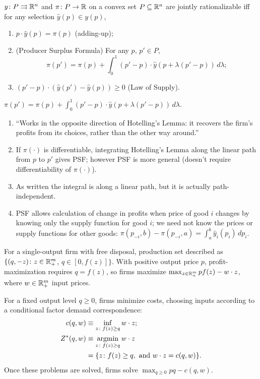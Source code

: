 \documentclass[8pt,letterpaper, landscape]{extarticle} %
\begin{document}
\begin{multicols}{3}
\begin{description}
 $ y \colon P \rightrightarrows \mathbb{R}^n $ and $ \pi \colon P \to \mathbb{R} $ on a convex set $ P \subseteq \mathbb{R}^n $ are jointly rationalizable iff for any selection $ \hat{y}(p) \in y(p) $,
\begin{enumerate}
\item $ p \cdot \hat{y}(p) = \pi(p) $ (adding-up);
\item (Producer Surplus Formula) For any $ p $, $ p' \in P $,
$$ \pi (p') = \pi (p) + \int_{0}^{1} (p' - p) \cdot \hat{y}(p + \lambda (p' - p)) \, d \lambda; $$
\item $ (p' - p) \cdot (\hat{y}(p') - \hat{y}(p)) \geq 0 $ (Law of Supply).
\end{enumerate}

 $ \pi (p') = \pi (p) + \int_{0}^{1} (p' - p) \cdot \hat{y}(p + \lambda (p' - p)) \, d \lambda $.
\begin{enumerate}
\item ``Works in the opposite direction of Hotelling's Lemma: it recovers the firm's profits from its choices, rather than the other way around.''
\item If $ \pi (\cdot) $ is differentiable, integrating Hotelling's Lemma along the linear path from $ p $ to $ p' $ gives PSF; however PSF is more general (doesn't require differentiability of $ \pi (\cdot) $).
\item As written the integral is along a linear path, but it is actually path-independent.
\item PSF allows calculation of change in profits when price of good $ i $ changes by knowing only the supply function for good $ i $; we need not know the prices or supply functions for other goods: $ \pi (p_{-i}, b) -  \pi (p_{-i}, a) = \int_{a}^{b} \hat{y}_i (p_i) \, dp_i $.
\end{enumerate}

 For a single-output firm with free disposal, production set described as $ \{ (q, -z) \colon z \in \mathbb{R}_+^m $, $ q \in [0, f(z)] \} $. With positive output price $ p $, profit-maximization requires $ q = f(z) $, so firms maximize
$ \max_{z \in \mathbb{R}_+^m} pf(z) - w \cdot z $, where $ w \in \mathbb{R}_+^m $ input prices.

 For a fixed output level $ q \geq 0 $, firms minimize costs, choosing inputs according to a conditional factor demand correspondence:
\begin{align*}
c(q,w) &\equiv \inf_{z \colon f(z) \geq q} w \cdot z; \\
Z^*(q,w) &\equiv \operatorname*{argmin}_{z \colon f(z) \geq q} w \cdot z \\
&= \{ z \colon f(z) \geq q, \text{ and } w \cdot z = c(q,w) \} .
\end{align*}
Once these problems are solved, firms solve $ \max_{q \geq 0} pq - c(q,w) $.


\end{description}
\end{multicols}
\end{document}
